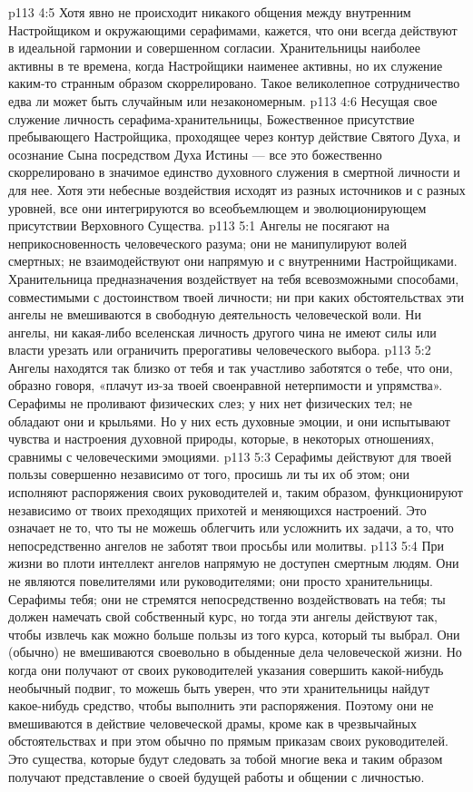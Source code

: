 \vs p113 4:5 Хотя явно не происходит никакого общения между внутренним Настройщиком и окружающими серафимами, кажется, что они всегда действуют в идеальной гармонии и совершенном согласии. Хранительницы наиболее активны в те времена, когда Настройщики наименее активны, но их служение каким\hyp{}то странным образом скоррелировано. Такое великолепное сотрудничество едва ли может быть случайным или незакономерным.
\vs p113 4:6 Несущая свое служение личность серафима\hyp{}хранительницы, Божественное присутствие пребывающего Настройщика, проходящее через контур действие Святого Духа, и осознание Сына посредством Духа Истины --- все это божественно скоррелировано в значимое единство духовного служения в смертной личности и для нее. Хотя эти небесные воздействия исходят из разных источников и с разных уровней, все они интегрируются во всеобъемлющем и эволюционирующем присутствии Верховного Существа.
\vs p113 5:1 Ангелы не посягают на неприкосновенность человеческого разума; они не манипулируют волей смертных; не взаимодействуют они напрямую и с внутренними Настройщиками. Хранительница предназначения воздействует на тебя всевозможными способами, совместимыми с достоинством твоей личности; ни при каких обстоятельствах эти ангелы не вмешиваются в свободную деятельность человеческой воли. Ни ангелы, ни какая\hyp{}либо вселенская личность другого чина не имеют силы или власти урезать или ограничить прерогативы человеческого выбора.
\vs p113 5:2 Ангелы находятся так близко от тебя и так участливо заботятся о тебе, что они, образно говоря, «плачут из\hyp{}за твоей своенравной нетерпимости и упрямства». Серафимы не проливают физических слез; у них нет физических тел; не обладают они и крыльями. Но у них есть духовные эмоции, и они испытывают чувства и настроения духовной природы, которые, в некоторых отношениях, сравнимы с человеческими эмоциями.
\vs p113 5:3 Серафимы действуют для твоей пользы совершенно независимо от того, просишь ли ты их об этом; они исполняют распоряжения своих руководителей и, таким образом, функционируют независимо от твоих преходящих прихотей и меняющихся настроений. Это означает не то, что ты не можешь облегчить или усложнить их задачи, а то, что непосредственно ангелов не заботят твои просьбы или молитвы.
\vs p113 5:4 При жизни во плоти интеллект ангелов напрямую не доступен смертным людям. Они не являются повелителями или руководителями; они просто хранительницы. Серафимы  тебя; они не стремятся непосредственно воздействовать на тебя; ты должен намечать свой собственный курс, но тогда эти ангелы действуют так, чтобы извлечь как можно больше пользы из того курса, который ты выбрал. Они (обычно) не вмешиваются своевольно в обыденные дела человеческой жизни. Но когда они получают от своих руководителей указания совершить какой\hyp{}нибудь необычный подвиг, то можешь быть уверен, что эти хранительницы найдут какое\hyp{}нибудь средство, чтобы выполнить эти распоряжения. Поэтому они не вмешиваются в действие человеческой драмы, кроме как в чрезвычайных обстоятельствах и при этом обычно по прямым приказам своих руководителей. Это существа, которые будут следовать за тобой многие века и таким образом получают представление о своей будущей работы и общении с личностью.
